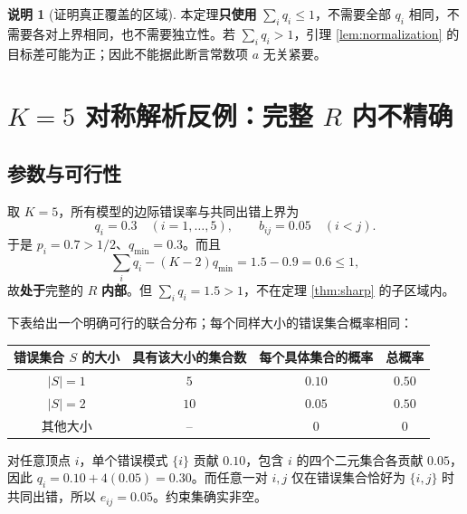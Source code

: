 \documentclass[11pt,a4paper]{ctexart}
\theoremstyle{definition}
\newtheorem{remark}[theorem]{说明}
\begin{document}
\begin{remark}[证明真正覆盖的区域]
本定理\textbf{只使用} $\sum_iq_i\le1$，不需要全部 $q_i$ 相同，不需要各对上界相同，也不需要独立性。若 $\sum_iq_i>1$，引理 \ref{lem:normalization} 的目标差可能为正；因此不能据此断言常数项 $a$ 无关紧要。
\end{remark}

\section{$K=5$ 对称解析反例：完整 $R$ 内不精确}
\subsection{参数与可行性}
取 $K=5$，所有模型的边际错误率与共同出错上界为
\begin{equation}\label{eq:counterdata}
q_i=0.3\quad(i=1,\ldots,5),\qquad b_{ij}=0.05\quad(i<j).
\end{equation}
于是 $p_i=0.7>1/2$、$q_{\min}=0.3$。而且
\[
\sum_iq_i-(K-2)q_{\min}=1.5-0.9=0.6\le1,
\]
故\textbf{处于}完整的 $R$ \textbf{内部}。但 $\sum_iq_i=1.5>1$，不在定理 \ref{thm:sharp} 的子区域内。

下表给出一个明确可行的联合分布；每个同样大小的错误集合概率相同：
\begin{center}
\begin{tabular}{@{}c c c c@{}}
\toprule
错误集合 $S$ 的大小 & 具有该大小的集合数 & \textbf{每个具体集合的概率} & 总概率\\
\midrule
$|S|=1$ & $5$ & $0.10$ & $0.50$\\
$|S|=2$ & $10$ & $0.05$ & $0.50$\\
其他大小 & -- & $0$ & $0$\\
\bottomrule
\end{tabular}
\end{center}
对任意顶点 $i$，单个错误模式 $\{i\}$ 贡献 $0.10$，包含 $i$ 的四个二元集合各贡献 $0.05$，因此 $q_i=0.10+4(0.05)=0.30$。而任意一对 $i,j$ 仅在错误集合恰好为 $\{i,j\}$ 时共同出错，所以 $e_{ij}=0.05$。约束集确实非空。
\end{document}
